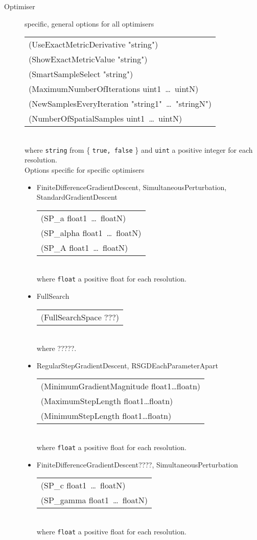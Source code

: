 \documentclass[a4paper]{article}
\newenvironment{Tabular}[1]{\ttfamily \begin{tabular}{#1}}{\end{tabular}}
\begin{document}
\begin{description}
\item[Optimiser] specific, general options for all optimisers\\
    \begin{Tabular}{l}
    (UseExactMetricDerivative "string") \\
    (ShowExactMetricValue "string") \\
    (SmartSampleSelect "string") \\
    (MaximumNumberOfIterations uint1~\ldots~uintN) \\
    (NewSamplesEveryIteration "string1"~\ldots~"stringN") \\
    (NumberOfSpatialSamples uint1~\ldots~uintN)
    \end{Tabular}\\
where \texttt{string} from \{ \texttt{true, false} \} and \texttt{uint} a positive
integer for each resolution.\\
Options specific for specific optimisers
    \begin{itemize}
    \item FiniteDifferenceGradientDescent, SimultaneousPerturbation, StandardGradientDescent\\
        \begin{Tabular}{l}
        (SP\_a float1~\ldots~floatN) \\
        (SP\_alpha float1~\ldots~floatN) \\
        (SP\_A float1~\ldots~floatN)
        \end{Tabular}\\
    where \texttt{float} a positive float for each resolution.
    \item FullSearch\\
        \begin{Tabular}{l}
        (FullSearchSpace ???)
        \end{Tabular}\\
    where ?????.
    \item RegularStepGradientDescent, RSGDEachParameterApart\\
        \begin{Tabular}{l}
        (MinimumGradientMagnitude float1\ldots floatn) \\
        (MaximumStepLength float1\ldots floatn) \\
        (MinimumStepLength float1\ldots floatn)
        \end{Tabular}\\
    where \texttt{float} a positive float for each resolution.
    \item FiniteDifferenceGradientDescent????, SimultaneousPerturbation\\
        \begin{Tabular}{l}
        (SP\_c float1~\ldots~floatN) \\
        (SP\_gamma float1~\ldots~floatN)
        \end{Tabular}\\
    where \texttt{float} a positive float for each resolution.
    \end{itemize}


\end{description}
\end{document}
